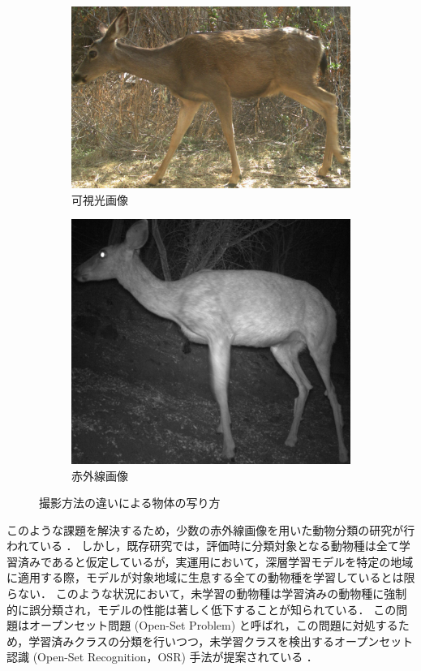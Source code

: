 \documentclass[a4paper,11pt,nomag]{jsreport}
\begin{document}
\begin{figure}[tbp]
  \centering
  \begin{subfigure}[b]{0.45\linewidth}
    \centering
    \includegraphics[height=0.7\linewidth, keepaspectratio]{image/cct_color_deer.png}
    \caption{可視光画像}
    \label{fig:color_deer}
  \end{subfigure}
  \hfill
  \begin{subfigure}[b]{0.45\linewidth}
    \centering
    \includegraphics[height=0.7\linewidth, keepaspectratio]{image/cct_infrared_deer.png}
    \caption{赤外線画像}
    \label{fig:infrared_deer}
  \end{subfigure}
  \caption{撮影方法の違いによる物体の写り方}
  \label{fig:camera}
\end{figure}

このような課題を解決するため，少数の赤外線画像を用いた動物分類の研究が行われている \cite{kishimoto2023}．
しかし，既存研究では，評価時に分類対象となる動物種は全て学習済みであると仮定しているが，実運用において，深層学習モデルを特定の地域に適用する際，モデルが対象地域に生息する全ての動物種を学習しているとは限らない．
このような状況において，未学習の動物種は学習済みの動物種に強制的に誤分類され，モデルの性能は著しく低下することが知られている．
この問題はオープンセット問題 (Open-Set Problem) と呼ばれ，この問題に対処するため，学習済みクラスの分類を行いつつ，未学習クラスを検出するオープンセット認識 (Open-Set Recognition，OSR) 手法が提案されている \cite{sun2020, sagar2022}．
\end{document}
